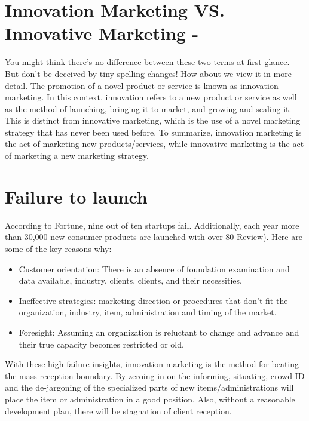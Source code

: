 \documentclass{article}
\begin{document}
\section{Innovation Marketing VS. Innovative Marketing -}
You might think there's no difference between these two terms at first glance. But don't
be deceived by tiny spelling changes! How about we view it in more detail.
The promotion of a novel product or service is known as innovation marketing. In this
context, innovation refers to a new product or service as well as the method of
launching, bringing it to market, and growing and scaling it.
This is distinct from innovative marketing, which is the use of a novel marketing strategy
that has never been used before.
To summarize, innovation marketing is the act of marketing new products/services,
while innovative marketing is the act of marketing a new marketing strategy.

\section{Failure to launch}

According to Fortune, nine out of ten startups fail. Additionally, each year more than
30,000 new consumer products are launched with over 80%
Review). Here are some of the key reasons why:

\begin{itemize}
\item Customer orientation: There is an absence of foundation examination and data
available, industry, clients, clients, and their necessities.

\item Ineffective strategies: marketing direction or procedures that don't fit the
organization, industry, item, administration and timing of the market.

\item Foresight: Assuming an organization is reluctant to change and advance and
their true capacity becomes restricted or old.

\end{itemize}
With these high failure insights, innovation marketing is the method for beating the
mass reception boundary. By zeroing in on the informing, situating, crowd ID and the
de-jargoning of the specialized parts of new items/administrations will place the item or
administration in a good position. Also, without a reasonable development plan, there
will be stagnation of client reception.
\end{document}
